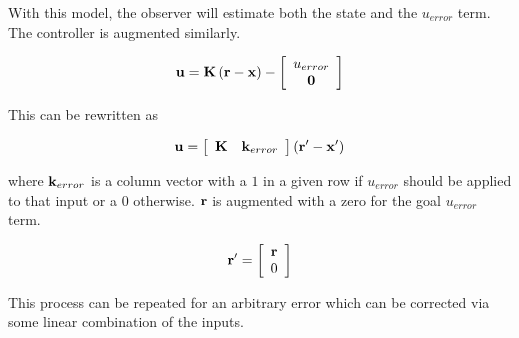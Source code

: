 With this model, the observer will estimate both the state and the $u_{error}$
term. The controller is augmented similarly.

\begin{equation*}
  \mathbf{u} = \mathbf{K} \left(\mathbf{r} - \mathbf{x}\right) - \left[
  \begin{array}{c}
    u_{error} \\
    \mathbf{0}
  \end{array}
  \right]
\end{equation*}

This can be rewritten as

\begin{equation*}
  \mathbf{u} = \left[
  \begin{array}{cc}
    \mathbf{K} & \mathbf{k}_{error}
  \end{array}
  \right] \left(\mathbf{r}' - \mathbf{x}'\right)
\end{equation*}

where $\mathbf{k}_{error}$ is a column vector with a $1$ in a given row if
$u_{error}$ should be applied to that input or a $0$ otherwise. $\mathbf{r}$ is
augmented with a zero for the goal $u_{error}$ term.

\begin{equation*}
  \mathbf{r}' = \left[
  \begin{array}{c}
    \mathbf{r} \\
    0
  \end{array}
  \right]
\end{equation*}

This process can be repeated for an arbitrary error which can be corrected via
some linear combination of the inputs.
